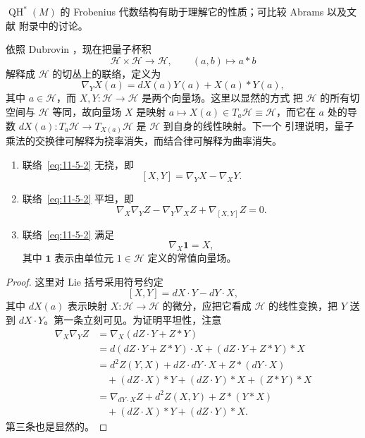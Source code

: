 \begin{remark}\label{rem:11-5-2}
$\operatorname{QH}^*(M)$ 的 Frobenius 代数结构有助于理解它的性质；可比较 Abrams
 以及文献  附录中的讨论。
\end{remark}

依照 Dubrovin ，现在把量子杯积
\[
  \mathcal H\times\mathcal H\longrightarrow\mathcal H,
  \qquad (a,b)\longmapsto a*b
\]
解释成 $\mathcal H$ 的切丛上的联络，定义为
\begin{equation}\label{eq:11-5-2}
  \nabla_YX(a)=dX(a)Y(a)+X(a)*Y(a),
\end{equation}
其中 $a\in\mathcal H$，而 $X,Y:\mathcal H\to\mathcal H$ 是两个向量场。这里以显然的方式
把 $\mathcal H$ 的所有切空间与 $\mathcal H$ 等同，故向量场 $X$ 是映射
$a\mapsto X(a)\in T_a\mathcal H\equiv\mathcal H$，而它在 $a$ 处的导数
$dX(a):T_a\mathcal H\to T_{X(a)}\mathcal H$ 是 $\mathcal H$ 到自身的线性映射。下一个
引理说明，量子乘法的交换律可解释为挠率消失，而结合律可解释为曲率消失。

\begin{lemma}\label{lem:11-5-3}
\begin{enumerate}[label=(\roman*)]
\item 联络~\eqref{eq:11-5-2} 无挠，即
\[
  [X,Y]=\nabla_YX-\nabla_XY.
\]

\item 联络~\eqref{eq:11-5-2} 平坦，即
\[
  \nabla_X\nabla_YZ-\nabla_Y\nabla_XZ+\nabla_{[X,Y]}Z=0.
\]

\item 联络~\eqref{eq:11-5-2} 满足
\[
  \nabla_X\mathbf 1=X,
\]
其中 $\mathbf 1$ 表示由单位元 $1\in\mathcal H$ 定义的常值向量场。
\end{enumerate}
\end{lemma}

\begin{proof}
这里对 Lie 括号采用符号约定
\[
  [X,Y]=dX\cdot Y-dY\cdot X,
\]
其中 $dX(a)$ 表示映射 $X:\mathcal H\to\mathcal H$ 的微分，应把它看成
$\mathcal H$ 的线性变换，把 $Y$ 送到 $dX\cdot Y$。第一条立刻可见。为证明平坦性，注意
\begin{align*}
  \nabla_X\nabla_YZ
  &=\nabla_X(dZ\cdot Y+Z*Y)\\
  &=d(dZ\cdot Y+Z*Y)\cdot X+(dZ\cdot Y+Z*Y)*X\\
  &=d^2Z(Y,X)+dZ\cdot dY\cdot X+Z*(dY\cdot X)\\
  &\quad +(dZ\cdot X)*Y+(dZ\cdot Y)*X+(Z*Y)*X\\
  &=\nabla_{dY\cdot X}Z+d^2Z(X,Y)+Z*(Y*X)\\
  &\quad +(dZ\cdot X)*Y+(dZ\cdot Y)*X.
\end{align*}
第三条也是显然的。
\end{proof}

